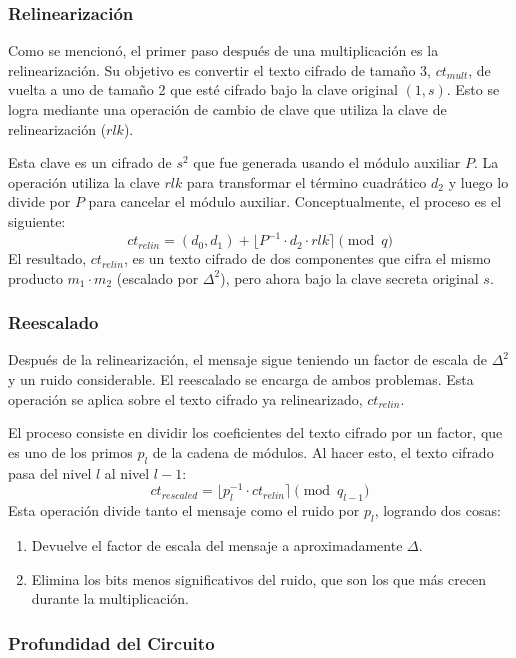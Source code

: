 \subsubsection{Relinearización}

Como se mencionó, el primer paso después de una multiplicación es la relinearización. Su objetivo es convertir el texto cifrado de tamaño 3, $ct_{mult}$, de vuelta a uno de tamaño 2 que esté cifrado bajo la clave original $(1, s)$. Esto se logra mediante una operación de cambio de clave que utiliza la clave de relinearización ($rlk$).

Esta clave es un cifrado de $s^2$ que fue generada usando el módulo auxiliar $P$. La operación utiliza la clave $rlk$ para transformar el término cuadrático $d_2$ y luego lo divide por $P$ para cancelar el módulo auxiliar. Conceptualmente, el proceso es el siguiente:
$$ ct_{relin} = (d_0, d_1) + \lfloor P^{-1} \cdot d_2 \cdot rlk \rceil \pmod q $$
El resultado, $ct_{relin}$, es un texto cifrado de dos componentes que cifra el mismo producto $m_1 \cdot m_2$ (escalado por $\Delta^2$), pero ahora bajo la clave secreta original $s$.

\subsubsection{Reescalado}

Después de la relinearización, el mensaje sigue teniendo un factor de escala de $\Delta^2$ y un ruido considerable. El reescalado se encarga de ambos problemas. Esta operación se aplica sobre el texto cifrado ya relinearizado, $ct_{relin}$.

El proceso consiste en dividir los coeficientes del texto cifrado por un factor, que es uno de los primos $p_l$ de la cadena de módulos. Al hacer esto, el texto cifrado pasa del nivel $l$ al nivel $l-1$:
$$ ct_{rescaled} = \lfloor p_l^{-1} \cdot ct_{relin} \rceil \pmod{q_{l-1}} $$
Esta operación divide tanto el mensaje como el ruido por $p_l$, logrando dos cosas:
\begin{enumerate}
    \item Devuelve el factor de escala del mensaje a aproximadamente $\Delta$.
    \item Elimina los bits menos significativos del ruido, que son los que más crecen durante la multiplicación.
\end{enumerate}

\subsubsection{Profundidad del Circuito}

